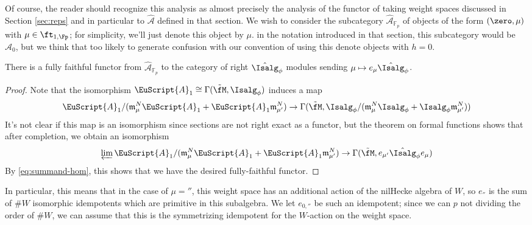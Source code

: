 Of course, the reader should recognize this analysis as almost precisely the analysis of the functor of taking weight spaces discussed in Section \ref{sec:reps} and in particular to $\widehat{\mathscr{A}}$ defined in that section.  We wish to consider the subcategory $   \widehat{\mathscr{A}}_{\mathbb{F}_p}$ of objects of the form $(\zero, \mu)$ with $\mu \in \ft_{1,\Fp}$; for simplicity, we'll just denote this object by $\mu$.  in the notation introduced in that section, this subcategory would be $\widehat{\mathscr{A}}_0$, but we think that too likely to generate confusion with our convention of using this denote objects with $h=0$.
\begin{lemma}\label{lem:A-H}
There is a fully faithful functor from  $\widehat{\mathscr{A}}_{\mathbb{F}_p}$ to the category of right $ \hat{\Isalg}_\phi$ modules sending  $\mu\mapsto e_{\mu}\hat{\Isalg}_\phi $.  
\end{lemma}
\begin{proof}
  Note that the isomorphism $\EuScript{A}_1\cong \Gamma(\tilde{\fM},{\Isalg}_\phi)$ induces a map
  \[ \EuScript{A}_1/(\mathfrak{m}_{\mu}^N
 \EuScript{A}_1+\EuScript{A}_1\mathfrak{m}_{\mu'}^N) \to \Gamma(\tilde{\fM}, {\Isalg}_\phi/(\mathfrak{m}_{\mu}^N
 {\Isalg}_\phi+{\Isalg}_\phi\mathfrak{m}_{\mu'}^N)  )\]
It's not clear if this map is an isomorphism since sections are not right exact as a functor, but the theorem on formal functions \cite[\href{https://stacks.math.columbia.edu/tag/02OC}{Theorem 02OC}]{stacks-project} shows that after completion, we obtain an isomorphism
  \[ \varprojlim
 \EuScript{A}_1/(\mathfrak{m}_{\mu}^N
 \EuScript{A}_1+\EuScript{A}_1\mathfrak{m}_{\mu'}^N)\to \Gamma(\tilde{\fM}, e_{\mu'}\hat{\Isalg}_\phi e_{\mu})\]
  By \eqref{eq:summand-hom}, this shows that we have the desired fully-faithful functor.
\end{proof}

In particular, this means that in the case of $\mu=\second$, this weight space has an additional action of the nilHecke algebra of $W$, so $e_{\second}$ is the sum of $\#W$ isomorphic idempotents which are primitive in this subalgebra. We let $e_{0,\second}$ be such an idempotent; since we can  $p$ not dividing the order of $\# W$, we can assume that this is the symmetrizing idempotent for the $W$-action on the weight space.   


